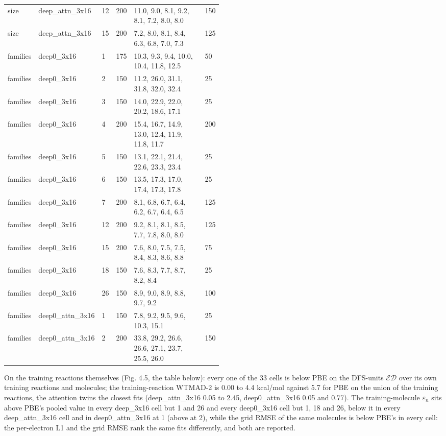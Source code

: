 \documentclass[10pt,a4paper]{article}
\begin{document}
\begin{landscape}
\begin{footnotesize}
\begin{longtable}{llllp{0.493\linewidth}l}
size & deep\_attn\_3x16 & 12 & 200 & 11.0, 9.0, 8.1, 9.2, 8.1, 7.2, 8.0, 8.0 & 150 \\
size & deep\_attn\_3x16 & 15 & 200 & 7.2, 8.0, 8.1, 8.4, 6.3, 6.8, 7.0, 7.3 & 125 \\
families & deep0\_3x16 & 1 & 175 & 10.3, 9.3, 9.4, 10.0, 10.4, 11.8, 12.5 & 50 \\
families & deep0\_3x16 & 2 & 150 & 11.2, 26.0, 31.1, 31.8, 32.0, 32.4 & 25 \\
families & deep0\_3x16 & 3 & 150 & 14.0, 22.9, 22.0, 20.2, 18.6, 17.1 & 25 \\
families & deep0\_3x16 & 4 & 200 & 15.4, 16.7, 14.9, 13.0, 12.4, 11.9, 11.8, 11.7 & 200 \\
families & deep0\_3x16 & 5 & 150 & 13.1, 22.1, 21.4, 22.6, 23.3, 23.4 & 25 \\
families & deep0\_3x16 & 6 & 150 & 13.5, 17.3, 17.0, 17.4, 17.3, 17.8 & 25 \\
families & deep0\_3x16 & 7 & 200 & 8.1, 6.8, 6.7, 6.4, 6.2, 6.7, 6.4, 6.5 & 125 \\
families & deep0\_3x16 & 12 & 200 & 9.2, 8.1, 8.1, 8.5, 7.7, 7.8, 8.0, 8.0 & 125 \\
families & deep0\_3x16 & 15 & 200 & 7.6, 8.0, 7.5, 7.5, 8.4, 8.3, 8.6, 8.8 & 75 \\
families & deep0\_3x16 & 18 & 150 & 7.6, 8.3, 7.7, 8.7, 8.2, 8.4 & 25 \\
families & deep0\_3x16 & 26 & 150 & 8.9, 9.0, 8.9, 8.8, 9.7, 9.2 & 100 \\
families & deep0\_attn\_3x16 & 1 & 150 & 7.8, 9.2, 9.5, 9.6, 10.3, 15.1 & 25 \\
families & deep0\_attn\_3x16 & 2 & 200 & 33.8, 29.2, 26.6, 26.6, 27.1, 23.7, 25.5, 26.0 & 150 \\
\bottomrule \end{longtable}
\end{footnotesize}
\end{landscape}


On the training reactions themselves (Fig. 4.5, the table below): every one of the 33 cells is below PBE on the DFS-units $\mathcal{ED}$ over its own training reactions and molecules; the training-reaction WTMAD-2 is 0.00 to 4.4 kcal/mol against 5.7 for PBE on the union of the training reactions, the attention twins the closest fits (deep\_attn\_3x16 0.05 to 2.45, deep0\_attn\_3x16 0.05 and 0.77). The training-molecule $\varepsilon_n$ sits above PBE's pooled value in every deep\_3x16 cell but 1 and 26 and every deep0\_3x16 cell but 1, 18 and 26, below it in every deep\_attn\_3x16 cell and in deep0\_attn\_3x16 at 1 (above at 2), while the grid RMSE of the same molecules is below PBE's in every cell: the per-electron L1 and the grid RMSE rank the same fits differently, and both are reported.
\end{document}
